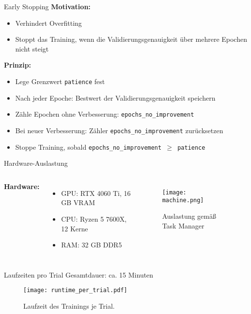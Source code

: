 \begin{frame}[fragile]{Early Stopping}
\textbf{Motivation:} 
\begin{itemize}
    \item Verhindert Overfitting
    \item Stoppt das Training, wenn die Validierungsgenauigkeit über mehrere Epochen nicht steigt
\end{itemize}

\textbf{Prinzip:}
\begin{itemize}
    \item Lege Grenzwert \texttt{patience} fest
    \item Nach jeder Epoche: Bestwert der Validierungsgenauigkeit speichern
    \item Zähle Epochen ohne Verbesserung: \texttt{epochs\_no\_improvement}
    \item Bei neuer Verbesserung: Zähler \texttt{epochs\_no\_improvement} zurücksetzen
    \item Stoppe Training, sobald \texttt{epochs\_no\_improvement $\ge$ patience}
\end{itemize}
\end{frame}
\begin{frame}{Hardware-Auslastung}
\begin{columns}[T,onlytextwidth]

    \textbf{Hardware:}
    \begin{itemize}
        \item GPU: RTX 4060 Ti, 16 GB VRAM
        \item CPU: Ryzen 5 7600X, 12 Kerne
        \item RAM: 32 GB DDR5
    \end{itemize}

    \begin{figure}
        \centering
        \texttt{[image: machine.png]}
        \caption{Auslastung gemäß Task Manager}
    \end{figure}

\end{columns}
\end{frame}


\begin{frame}{Laufzeiten pro Trial}
Gesamtdauer: ca. 15 Minuten

\begin{figure}
    \centering
    \texttt{[image: runtime\_per\_trial.pdf]}
    \caption{Laufzeit des Trainings je Trial.}
\end{figure}
\end{frame}
